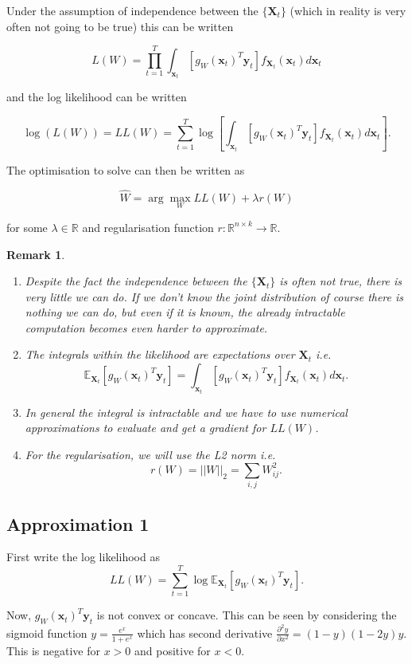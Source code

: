 \documentclass[
10pt, %
a4paper, %
oneside, %
headinclude,footinclude, %
BCOR5mm, %
]{scrartcl}
\newcommand{\bfX}{\boldsymbol{X}}
\newcommand{\bfx}{\boldsymbol{x}}
\newcommand{\bfy}{\boldsymbol{y}}
\newtheorem{remark}{Remark}
\begin{document}
Under the assumption of independence between the $\{\bfX_t\}$ (which in reality is very often not going to be true) this can be written

$$ L(W) = \prod_{t=1}^T \int_{\bfx_t} \left [g_W(\bfx_t)^T \bfy_t \right ] f_{\bfX_t}(\bfx_t) d\bfx_t$$

and the log likelihood can be written

$$ \log(L(W)) = LL(W) = \sum_{t=1}^T \log \left [ \int_{\bfx_t} \left [g_W(\bfx_t)^T \bfy_t \right ] f_{\bfX_t}(\bfx_t) d\bfx_t \right ].$$

The optimisation to solve can then be written as

$$ \hat{W} = \arg \max_W LL(W) + \lambda r(W)$$

for some $\lambda \in \mathbb{R}$ and regularisation function $r: \mathbb{R}^{n \times k} \rightarrow \mathbb{R}$.

\begin{remark}
\begin{enumerate}
  \item Despite the fact the independence between the $\{\bfX_t\}$ is often not true, there is very little we can do. If we don't know the joint distribution of course there is nothing we can do, but even if it is known, the already intractable computation becomes even harder to approximate.
  \item The integrals within the likelihood are expectations over $\bfX_t$ i.e.
  $$ \mathbb{E}_{\bfX_t} \left [ g_W(\bfx_t)^T \bfy_t \right ] = \int_{\bfx_t} \left [g_W(\bfx_t)^T \bfy_t \right ] f_{\bfX_t}(\bfx_t) d\bfx_t.$$
  \item In general the integral is intractable and we have to use numerical approximations to evaluate and get a gradient for $LL(W)$.
  \item For the regularisation, we will use the L2 norm i.e. 
  $$r(W) = || W ||_2 = \sum_{i,j} W_{ij}^2.$$
\end{enumerate}
\end{remark}

\subsection{Approximation 1}
First write the log likelihood as 
$$ LL(W) = \sum_{t=1}^T \log \mathbb{E}_{\bfX_t} \left [g_W(\bfx_t)^T \bfy_t \right ]. $$

Now, $g_W(\bfx_t)^T \bfy_t$ is not convex or concave. This can be seen by considering the sigmoid function $y = \frac{e^x}{1+e^x}$ which has second derivative $\frac{\partial^2 y}{\partial x^2} = (1-y)(1-2y)y$. This is negative for $x > 0$ and positive for $x < 0$.
\end{document}
